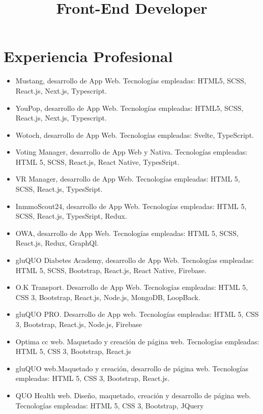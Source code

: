 \documentclass[11pt,a4paper]{moderncv}
\title{Front-End Developer}
\begin{document}
    \maketitle
    \section{Experiencia Profesional}
    {\begin{itemize}
         \item Mustang, desarrollo de App Web. Tecnologías empleadas: HTML5, SCSS, React.js, Next.js, Typescript.
         \item YouPop, desarrollo de App Web. Tecnologías empleadas: HTML5, SCSS, React.js, Next.js, Typescript.
    \end{itemize}
    }
    {\begin{itemize}
         \item Wotoch, desarrollo de App Web. Tecnologías empleadas: Svelte, TypeScript.
         \item Voting Manager, desarrollo de App Web y Nativa. Tecnologías empleadas: HTML 5, SCSS, React.js, React Native, TypesSript.
         \item VR Manager, desarrollo de App Web. Tecnologías empleadas: HTML 5, SCSS, React.js, TypesSript.
         \item InmmoScout24, desarrollo de App Web. Tecnologías empleadas: HTML 5, SCSS, React.js, TypesSript, Redux.
    \end{itemize}
    }
    {\begin{itemize}
         \item OWA, desarrollo de App Web. Tecnologías empleadas: HTML 5, SCSS, React.js, Redux, GraphQl.
    \end{itemize}
    }
    {\begin{itemize}
         \item gluQUO Diabetes Academy, desarrollo de App Web. Tecnologías empleadas: HTML 5, SCSS, Bootstrap, React.js, React Native, Firebase.
         \item O.K Transport. Desarrollo de App Web. Tecnologías empleadas: HTML 5, CSS 3, Bootstrap, React.js, Node.js, MongoDB, LoopBack.
         \item gluQUO PRO. Desarrollo de App web. Tecnologías empleadas: HTML 5, CSS 3, Bootstrap, React.js, Node.js, Firebase
         \item Optima cc web. Maquetado y creación de página web. Tecnologías empleadas: HTML 5, CSS 3, Bootstrap, React.js
         \item gluQUO web.Maquetado y creación, desarrollo de página web. Tecnologías empleadas: HTML 5, CSS 3, Bootstrap, React.js.
         \item QUO Health web. Diseño, maquetado, creación y desarrollo de página web. Tecnologías empleadas: HTML 5, CSS 3, Bootstrap, JQuery
    \end{itemize}
    }
\end{document}

